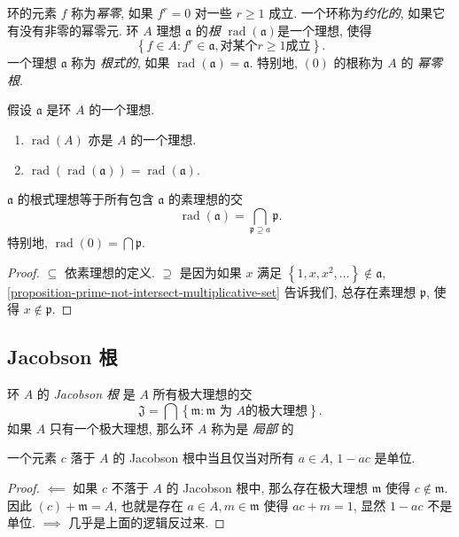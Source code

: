 环的元素 \( f \) 称为\emph{幂零}, 如果 \( f^r = 0 \) 对一些 \( r \geq 1 \) 成立.
一个环称为\emph{约化的}, 如果它有没有非零的幂零元. 环 \( A \) 理想 \(
\mathfrak{a} \) 的\emph{根} \( \operatorname{rad}(\mathfrak{a}) \)是一个理想,
使得
\[
  \left\lbrace f \in A : f^r \in \mathfrak{a}, \text{对某个} r \geq 1
  \text{成立} \right\rbrace.
\]
一个理想 \( \mathfrak{a} \) 称为 \emph{根式的}, 如果 \(
\operatorname{rad}(\mathfrak{a}) = \mathfrak{a} \). 特别地, \( (0) \) 的根称为
\( A \) 的 \emph{幂零根}.

\begin{proposition}
  假设 \( \mathfrak{a} \) 是环 \( A \) 的一个理想.
  \begin{enumerate}
    \item \( \operatorname{rad}(A) \) 亦是 \( A \) 的一个理想.
    \item \( \operatorname{rad}(\operatorname{rad}(\mathfrak{a})) =
      \operatorname{rad}(\mathfrak{a}) \).
  \end{enumerate}
\end{proposition}

\begin{proposition}
  \( \mathfrak{a} \) 的根式理想等于所有包含 \( \mathfrak{a} \) 的素理想的交
  \[
    \operatorname{rad}(\mathfrak{a}) = \bigcap_{\mathfrak{p}\supseteq a}
    \mathfrak{p}.
  \]
  特别地, \( \operatorname{rad}(0) = \bigcap \mathfrak{p} \).
\end{proposition}
\begin{proof}
  \( \subseteq \) 依素理想的定义. \( \supseteq \) 是因为如果 \( x \) 满足 \(
  \left\lbrace 1, x, x^2, \ldots \right\rbrace \notin \mathfrak{a} \),
  \cref{proposition-prime-not-intersect-multiplicative-set} 告诉我们,
  总存在素理想 \(  \mathfrak{p} \), 使得 \( x \notin \mathfrak{p} \).
\end{proof}

\subsection{Jacobson 根}

环 \( A \) 的 \emph{Jacobson 根} 是 \( A \) 所有极大理想的交
\[
  \mathfrak{J} = \bigcap \left\lbrace \mathfrak{m}: \mathfrak{m} \text{ 为 } A
  \text{的极大理想} \right\rbrace.
\]
如果 \( A \) 只有一个极大理想, 那么环 \( A \) 称为是 \emph{局部} 的

\begin{proposition}
  一个元素 \( c \) 落于 \( A \) 的 Jacobson 根中当且仅当对所有 \( a \in A \), \(
  1 - ac \) 是单位.
\end{proposition}
\begin{proof}
  \( \impliedby \) 如果 \( c \) 不落于 \( A \) 的 Jacobson 根中,
  那么存在极大理想 \( \mathfrak{m} \) 使得 \( c \notin \mathfrak{m} \). 因此 \(
  (c) + \mathfrak{m} = A \), 也就是存在 \( a \in A, m \in \mathfrak{m} \) 使得
  \( ac + m = 1 \), 显然 \( 1 - ac \) 不是单位.  \( \implies \)
  几乎是上面的逻辑反过来.
\end{proof}

